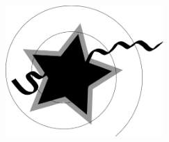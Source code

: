 \documentclass[a4paper,11pt,twoside]{article}
\begin{document}
\newpage
\begin{figure}[h!]
  \caption{}
  \label{Fig2}
  \begin{center}
    \includegraphics[width=6cm]{Fig2}
  \end{center}
\end{figure}
\end{document}
